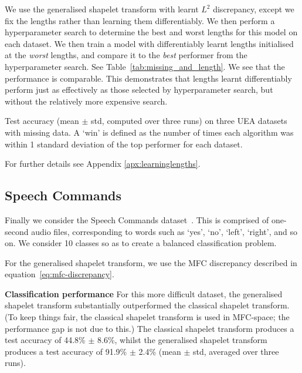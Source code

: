 \documentclass{article}
\theoremstyle{plain}
\theoremstyle{definition}
\newcommand{\boldheading}[1]{

\textbf{#1}\quad}
\begin{document}
We use the generalised shapelet transform with learnt $L^2$ discrepancy, except we fix the lengths rather than learning them differentiably. We then perform a hyperparameter search to determine the best and worst lengths for this model on each dataset. We then train a model with differentiably learnt lengths initialised at the \emph{worst} lengths, and compare it to the \emph{best} performer from the hyperparameter search. See Table~\ref{tab:missing_and_length}. We see that the performance is comparable. This demonstrates that lengths learnt differentiably perform just as effectively as those selected by hyperparameter search, but without the relatively more expensive search.

\begin{table}[t]
    \centering
	\caption{Test accuracy (mean $\pm$ std, computed over three runs) on three UEA datasets with missing data. A `win' is defined as the number of times each algorithm was within 1 standard deviation of the top performer for each dataset.}\label{tab:missing_and_length}
    
\end{table}

For further details see Appendix \ref{apx:learninglengths}.


\subsection{Speech Commands}
Finally we consider the Speech Commands dataset~\cite{warden2018speech}. This is comprised of one-second audio files, corresponding to words such as `yes', `no', `left', `right', and so on. We consider 10 classes so as to create a balanced classification problem.

For the generalised shapelet transform, we use the MFC discrepancy described in equation~\eqref{eq:mfc-discrepancy}.%

\boldheading{Classification performance} For this more difficult dataset, the generalised shapelet transform substantially outperformed the classical shapelet transform. (To keep things fair, the classical shapelet transform is used in MFC-space; the performance gap is not due to this.) The classical shapelet transform produces a test accuracy of 44.8\% $\pm$ 8.6\%, whilst the generalised shapelet transform produces a test accuracy of 91.9\% $\pm$ 2.4\% (mean $\pm$ std, averaged over three runs).
\end{document}
